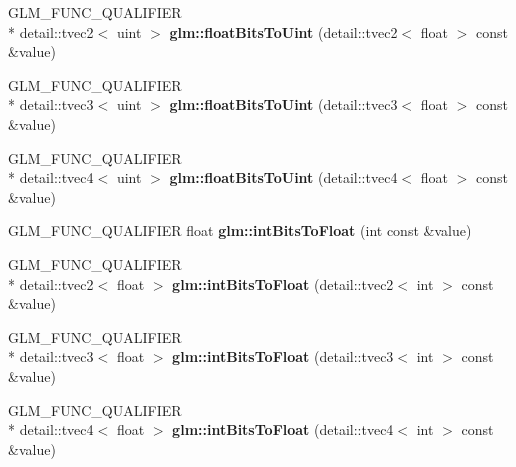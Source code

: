 \begin{DoxyCompactItemize}
\item 
\hypertarget{namespaceglm_aa26d288b80921dccfba14f1f87c69dc9}{G\-L\-M\-\_\-\-F\-U\-N\-C\-\_\-\-Q\-U\-A\-L\-I\-F\-I\-E\-R \\*
detail\-::tvec2$<$ uint $>$ {\bfseries glm\-::float\-Bits\-To\-Uint} (detail\-::tvec2$<$ float $>$ const \&value)}\label{namespaceglm_aa26d288b80921dccfba14f1f87c69dc9}

\item 
\hypertarget{namespaceglm_a9e237f6129858d6a60a5fbb311940b7a}{G\-L\-M\-\_\-\-F\-U\-N\-C\-\_\-\-Q\-U\-A\-L\-I\-F\-I\-E\-R \\*
detail\-::tvec3$<$ uint $>$ {\bfseries glm\-::float\-Bits\-To\-Uint} (detail\-::tvec3$<$ float $>$ const \&value)}\label{namespaceglm_a9e237f6129858d6a60a5fbb311940b7a}

\item 
\hypertarget{namespaceglm_a597a1ed8073a6f211a0b99bc5bcb5e81}{G\-L\-M\-\_\-\-F\-U\-N\-C\-\_\-\-Q\-U\-A\-L\-I\-F\-I\-E\-R \\*
detail\-::tvec4$<$ uint $>$ {\bfseries glm\-::float\-Bits\-To\-Uint} (detail\-::tvec4$<$ float $>$ const \&value)}\label{namespaceglm_a597a1ed8073a6f211a0b99bc5bcb5e81}

\item 
\hypertarget{namespaceglm_aa13860620ac74cd63473808c6566b004}{G\-L\-M\-\_\-\-F\-U\-N\-C\-\_\-\-Q\-U\-A\-L\-I\-F\-I\-E\-R float {\bfseries glm\-::int\-Bits\-To\-Float} (int const \&value)}\label{namespaceglm_aa13860620ac74cd63473808c6566b004}

\item 
\hypertarget{namespaceglm_aeff766c2b3cd8e57cc766db3d6c05584}{G\-L\-M\-\_\-\-F\-U\-N\-C\-\_\-\-Q\-U\-A\-L\-I\-F\-I\-E\-R \\*
detail\-::tvec2$<$ float $>$ {\bfseries glm\-::int\-Bits\-To\-Float} (detail\-::tvec2$<$ int $>$ const \&value)}\label{namespaceglm_aeff766c2b3cd8e57cc766db3d6c05584}

\item 
\hypertarget{namespaceglm_aee5c11244c968fb1c469ef36b8bee088}{G\-L\-M\-\_\-\-F\-U\-N\-C\-\_\-\-Q\-U\-A\-L\-I\-F\-I\-E\-R \\*
detail\-::tvec3$<$ float $>$ {\bfseries glm\-::int\-Bits\-To\-Float} (detail\-::tvec3$<$ int $>$ const \&value)}\label{namespaceglm_aee5c11244c968fb1c469ef36b8bee088}

\item 
\hypertarget{namespaceglm_a294e8d88fb5291ef59df36fb925d70bc}{G\-L\-M\-\_\-\-F\-U\-N\-C\-\_\-\-Q\-U\-A\-L\-I\-F\-I\-E\-R \\*
detail\-::tvec4$<$ float $>$ {\bfseries glm\-::int\-Bits\-To\-Float} (detail\-::tvec4$<$ int $>$ const \&value)}\label{namespaceglm_a294e8d88fb5291ef59df36fb925d70bc}


\end{DoxyCompactItemize}
